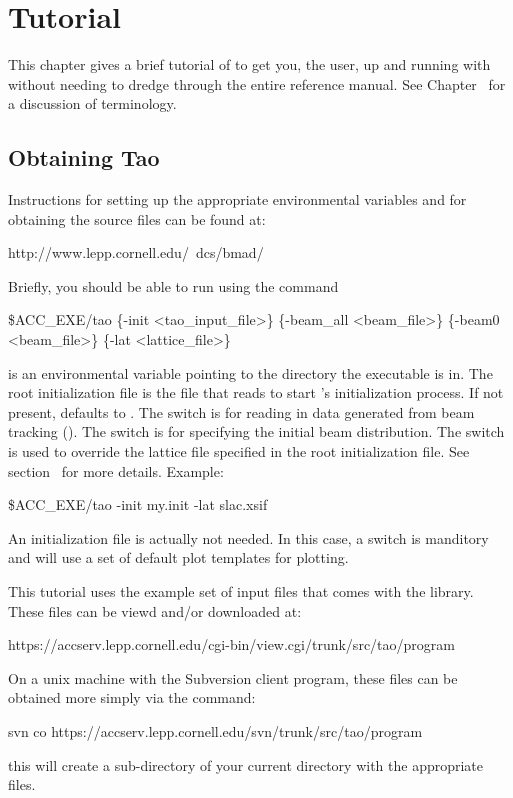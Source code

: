 \chapter{Tutorial}
\label{c:tutorial}

This chapter gives a brief tutorial of \tao to get you, the user, up
and running with \tao without needing to dredge through the entire
reference manual. See Chapter~ for a discussion of
\tao terminology.

\section{Obtaining Tao}
\label{s:obtaining}

Instructions for setting up the appropriate environmental variables
and for obtaining the source files can be found at:
\begin{example}
  http://www.lepp.cornell.edu/~dcs/bmad/
\end{example}

Briefly, you should be able to run \tao using the command
\begin{example}
  \$ACC_EXE/tao \{-init <tao_input_file>\} \{-beam_all <beam_file>\} 
           \{-beam0 <beam_file>\} \{-lat <lattice_file>\}
\end{example}
 is an environmental variable pointing to the directory
the \tao executable is in.  The root initialization file
 is the file that \tao reads to start \tao's
initialization process. If not present,  defaults
to . The  switch is for reading in data
generated from beam tracking (). The 
switch is for specifying the initial beam distribution.  The
 switch is used to override the lattice file specified in
the root initialization file. See section~ for
more details. Example:
\begin{example}
  \$ACC_EXE/tao -init my.init -lat slac.xsif
\end{example}
An initialization file is actually not needed. In this case, a
 switch is manditory and \tao will use a set of default plot
templates for plotting.

This tutorial uses the example set of input files that comes with the \tao library.
These files can be viewd and/or downloaded at:
\begin{example}
  https://accserv.lepp.cornell.edu/cgi-bin/view.cgi/trunk/src/tao/program
\end{example}
On a unix machine with the Subversion  client program, 
these files can be obtained more simply via the command:
\begin{example}
  svn co https://accserv.lepp.cornell.edu/svn/trunk/src/tao/program
\end{example}
this will create a sub-directory  of your current directory with 
the appropriate files.

